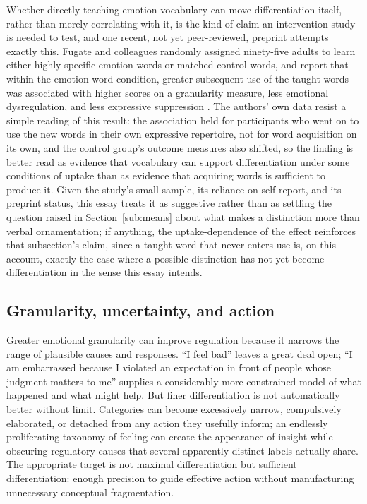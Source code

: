 \documentclass[11pt]{article}
\begin{document}
Whether directly teaching emotion vocabulary can move differentiation itself, rather than merely correlating with it, is the kind of claim an intervention study is needed to test, and one recent, not yet peer-reviewed, preprint attempts exactly this. Fugate and colleagues randomly assigned ninety-five adults to learn either highly specific emotion words or matched control words, and report that within the emotion-word condition, greater subsequent use of the taught words was associated with higher scores on a granularity measure, less emotional dysregulation, and less expressive suppression \citep{Fugate2026}. The authors' own data resist a simple reading of this result: the association held for participants who went on to use the new words in their own expressive repertoire, not for word acquisition on its own, and the control group's outcome measures also shifted, so the finding is better read as evidence that vocabulary can support differentiation under some conditions of uptake than as evidence that acquiring words is sufficient to produce it. Given the study's small sample, its reliance on self-report, and its preprint status, this essay treats it as suggestive rather than as settling the question raised in Section~\ref{sub:means} about what makes a distinction more than verbal ornamentation; if anything, the uptake-dependence of the effect reinforces that subsection's claim, since a taught word that never enters use is, on this account, exactly the case where a possible distinction has not yet become differentiation in the sense this essay intends.

\subsection{Granularity, uncertainty, and action}

Greater emotional granularity can improve regulation because it narrows the range of plausible causes and responses. ``I feel bad'' leaves a great deal open; ``I am embarrassed because I violated an expectation in front of people whose judgment matters to me'' supplies a considerably more constrained model of what happened and what might help. But finer differentiation is not automatically better without limit. Categories can become excessively narrow, compulsively elaborated, or detached from any action they usefully inform; an endlessly proliferating taxonomy of feeling can create the appearance of insight while obscuring regulatory causes that several apparently distinct labels actually share. The appropriate target is not maximal differentiation but sufficient differentiation: enough precision to guide effective action without manufacturing unnecessary conceptual fragmentation.
\end{document}
